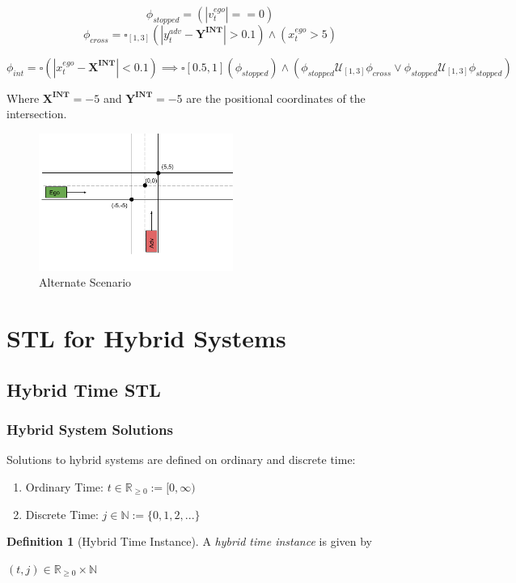 \documentclass{article}
\theoremstyle{definition}
\newtheorem{definition}{Definition}[section]
\begin{document}
\begin{equation}
    \phi_{stopped} = (|v_{t}^{ego}|==0)
\end{equation}
\begin{equation}
    \phi_{cross} = \square_{[1,3]}(|y_{t}^{adv} - \mathbf{Y^{INT}}| > 0.1) \land (x_{t}^{ego} > 5)
\end{equation}

\begin{equation}
    \phi_{int} = \square(|x_{t}^{ego} -\mathbf{X^{INT}}|  < 0.1) \implies
    \square{[0.5,1]}(\phi_{stopped}) \land (\phi_{stopped}\mathcal{U}_{[1, 3]}\phi_{cross} \lor \phi_{stopped}\mathcal{U}_{[1,3]}\phi_{stopped})
\end{equation}

Where $\mathbf{X^{INT}} = -5$ and $\mathbf{Y^{INT}} = -5$
are the positional coordinates of the intersection.

\begin{figure}[H] 
\centering
\includegraphics[width=2.5in]{Figures/intersection_stl.png}
\caption{Alternate Scenario}
\label{fig:alt_intersection}
\end{figure}


\section{STL for Hybrid Systems}

\subsection{Hybrid Time STL}
\subsubsection{Hybrid System Solutions}
Solutions to hybrid systems are defined on ordinary and discrete time:
\begin{enumerate}
    \item Ordinary Time: $t\in\mathbb{R}_{\geq0} :=  [0,\infty)$
    \item Discrete Time: $j\in\mathbb{N} := \{0,1,2,...\}$
\end{enumerate}
\begin{definition}[Hybrid Time Instance]
A \textit{hybrid time instance} is given by
\begin{center}
    $(t,j) \in \mathbb{R}_{\geq0} \times \mathbb{N}$
\end{center}
\end{definition}
\end{document}
